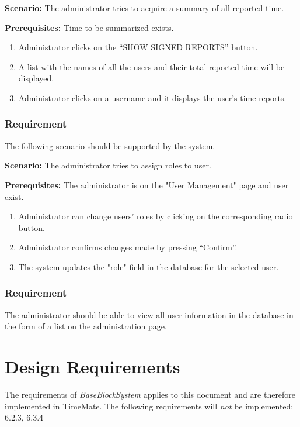 \documentclass{article}
\begin{document}
\textbf{Scenario:} The administrator tries to acquire a summary of all reported time.

\textbf{Prerequisites:} Time to be summarized exists.

\begin{enumerate}
    \item Administrator clicks on the “SHOW SIGNED REPORTS” button.
    \item A list with the names of all the users and their total reported time will be displayed.
    \item Administrator clicks on a username and it displays the user’s time reports.
\end{enumerate}

\subsubsection{Requirement}
The following scenario should be supported by the system.

\textbf{Scenario:} The administrator tries to assign roles to user.

\textbf{Prerequisites:} The administrator is on the "User Management" page and user exist.

\begin{enumerate}
    \item Administrator can change users' roles by clicking on the corresponding radio button.
    \item Administrator confirms changes made by pressing “Confirm”.
    \item The system updates the "role" field in the database for the selected user.
    
\end{enumerate}

\subsubsection{Requirement}
The administrator should be able to view all user information in the database in the form of a list on the administration page. 

\section{Design Requirements}
\item The requirements of \emph{BaseBlockSystem} applies to this document and are therefore implemented in TimeMate. The following requirements will \emph{not} be implemented; 6.2.3, 6.3.4
\end{document}
